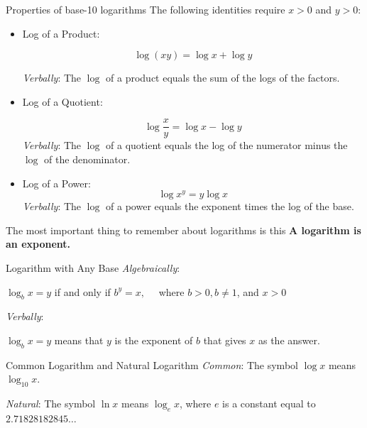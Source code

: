 \begin{custombox}{Properties of base-10 logarithms}
The following identities require $x>0$ and $y>0$:
\begin{itemize}
    \item Log of a Product:
    
    \[
    \log(xy)=\log x+\log y
    \]
    
    \textit{Verbally}: The $\log$ of a product equals the sum of the logs of the factors.
    \vspace{0.2cm}
    \item Log of a Quotient:
    
    \[
    \log \frac{x}{y}=\log x-\log y
    \]
    \vspace{0.1cm}
    \textit{Verbally}: The $\log$ of a quotient equals the log of the numerator minus the $\log$ of the denominator.
    \vspace{0.2cm}
    \item Log of a Power:
    \[
    \log x^y=y \log x
    \]
    \textit{Verbally}: The $\log$ of a power equals the exponent times the log of the base.
\end{itemize}

   
\end{custombox}

\begin{custombox}{The most important thing to remember about logarithms is this}
    \textbf{A logarithm is an exponent.}
\end{custombox}

\begin{definition}{Logarithm with Any Base}
\textit{Algebraically}:

\hspace{1cm}$\log _b x=y$ if and only if $b^y=x, \quad$ where $b>0, b \neq 1$, and $x>0$

\vspace{0.3cm}

\textit{Verbally}:

\hspace{1cm} $\log _b x=y$ means that $y$ is the exponent of $b$ that gives $x$ as the answer.
    
\end{definition}

\begin{definition}{Common Logarithm and Natural Logarithm}
\hspace{1cm} \textit{Common}: The symbol $\log x$ means $\log _{10} x$.

\hspace{1cm}  \textit{Natural}: \hspace{0.2cm}The symbol $\ln x$ means $\log _e x$, where $e$ is a constant equal to $2.71828182845 \ldots$
\end{definition}

